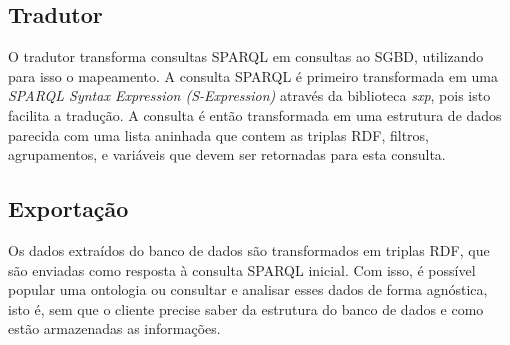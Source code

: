 \subsection{Tradutor}
O tradutor transforma consultas SPARQL em consultas ao SGBD, utilizando para
isso o mapeamento. A consulta SPARQL é primeiro transformada em uma
\textit{SPARQL Syntax Expression (S-Expression)} através da biblioteca
\textit{sxp}\footnotemark, pois isto facilita a tradução. A consulta é então
transformada em uma estrutura de dados parecida com uma lista aninhada que
contem as triplas RDF, filtros, agrupamentos, e variáveis que devem ser
retornadas para esta consulta.


\subsection{Exportação}
Os dados extraídos do banco de dados são transformados em triplas RDF, que são
enviadas como resposta à consulta SPARQL inicial. Com isso, é possível popular
uma ontologia ou consultar e analisar esses dados de forma agnóstica, isto é,
sem que o cliente precise saber da estrutura do banco de dados e como estão
armazenadas as informações.





